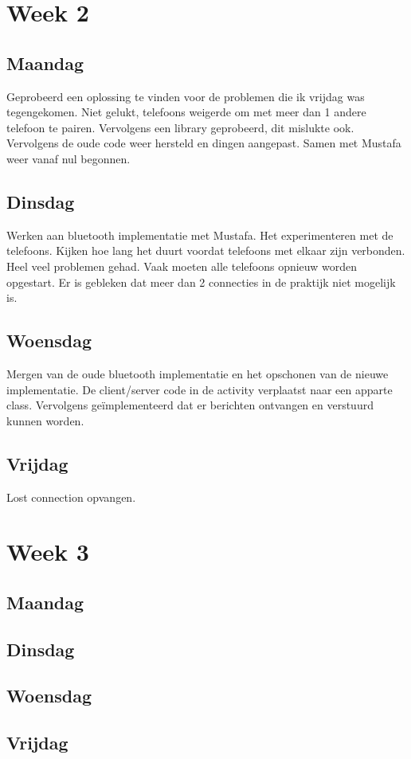 \documentclass[12pt]{article}
\begin{document}
\section*{Week 2}
\subsection*{Maandag}
Geprobeerd een oplossing te vinden voor de problemen die ik vrijdag was tegengekomen. Niet gelukt, telefoons weigerde om met meer dan 1 andere telefoon te pairen. Vervolgens een library geprobeerd, dit mislukte ook. Vervolgens de oude code weer hersteld en dingen aangepast. Samen met Mustafa weer vanaf nul begonnen.

\subsection*{Dinsdag}
Werken aan bluetooth implementatie met Mustafa. Het experimenteren met de telefoons. Kijken hoe lang het duurt voordat telefoons met elkaar zijn verbonden. Heel veel problemen gehad. Vaak moeten alle telefoons opnieuw worden opgestart. Er is gebleken dat meer dan 2 connecties in de praktijk niet mogelijk is.

\subsection*{Woensdag}
Mergen van de oude bluetooth implementatie en het opschonen van de nieuwe implementatie. De client/server code in de activity verplaatst naar een apparte class. Vervolgens ge\"implementeerd dat er berichten ontvangen en verstuurd kunnen worden.

\subsection*{Vrijdag}
Lost connection opvangen.

\section*{Week 3}
\subsection*{Maandag}
\subsection*{Dinsdag}
\subsection*{Woensdag}
\subsection*{Vrijdag}
\end{document}
